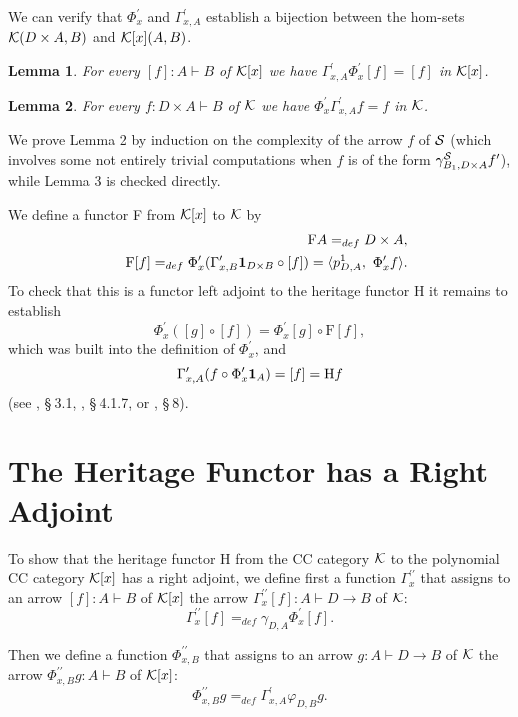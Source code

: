\documentclass[12pt]{article}
\newtheorem{lemma}{Lemma}
\begin{document}
We can verify that $\Phi _{x}^{\prime }$ and $\Gamma _{x,A}^{\prime }$
establish a bijection between the hom-sets ${\cal K}(D\times A,B)$ and $%
{\cal K}[x](A,B)$.

\begin{lemma}
For every $[f]:A\vdash B$ of ${\cal K}[x]$ we have $\Gamma _{x,A}^{\prime
}\Phi _{x}^{\prime }[f]=[f]$ in ${\cal K}[x]$.
\end{lemma}

\begin{lemma}
For every $f:D\times A\vdash B$ of ${\cal K}$ we have $\Phi _{x}^{\prime
}\Gamma _{x,A}^{\prime }f=f$ in ${\cal K}$.
\end{lemma}

\noindent We prove Lemma 2 by induction on the complexity of the arrow $f$
of ${\cal S}$ (which involves some not entirely trivial computations when $f$
is of the form $\gamma _{B_{1},D\times A}^{{\cal S}}f^{\prime }$), while
Lemma 3 is checked directly.

We define a functor F from ${\cal K}[x]$ to ${\cal K}$ by 
\begin{eqnarray*}
&&\text{F}A=_{def}D\times A, \\
&&\text{F}[f]=_{def}\Phi _{x}^{\prime }(\Gamma _{x,B}^{\prime }{\bf 1}%
_{D\times B}\circ [f])=\langle p_{D,A}^{1},~\Phi _{x}^{\prime }f\rangle .
\end{eqnarray*}
To check that this is a functor left adjoint to the heritage functor H it
remains to establish 
\[
\Phi _{x}^{\prime }([g]\circ [f])=\Phi _{x}^{\prime }[g]\circ \text{F}[f], 
\]
which was built into the definition of $\Phi _{x}^{\prime }$, and 
\[
\Gamma _{x,A}^{\prime }(f\circ \Phi _{x}^{\prime }{\bf 1}_{A})=[f]=\text{H}f 
\]
(see \cite{D.96}, \S $~$3.1, \cite{D.99}, \S $~$4.1.7, or \cite{D.99a}, \S $%
~ $8).

\section{The Heritage Functor has a Right Adjoint}

\noindent To show that the heritage functor H from the CC category ${\cal K}$
to the polynomial CC category ${\cal K}[x]$ has a right adjoint, we define
first a function $\Gamma _{x}^{\prime \prime }$ that assigns to an arrow $%
[f]:A\vdash B$ of ${\cal K}[x]$ the arrow $\Gamma _{x}^{\prime \prime
}[f]:A\vdash D\rightarrow B$ of ${\cal K}$: 
\[
\Gamma _{x}^{\prime \prime }[f]=_{def}\gamma _{D,A}\Phi _{x}^{\prime }[f]. 
\]

\noindent Then we define a function $\Phi _{x,B}^{\prime \prime }$ that
assigns to an arrow $g:A\vdash D\rightarrow B$ of ${\cal K}$ the arrow $\Phi
_{x,B}^{\prime \prime }g:A\vdash B$ of ${\cal K}[x]$: 
\[
\Phi _{x,B}^{\prime \prime }g=_{def}\Gamma _{x,A}^{\prime }\varphi _{D,B}g. 
\]
\end{document}

